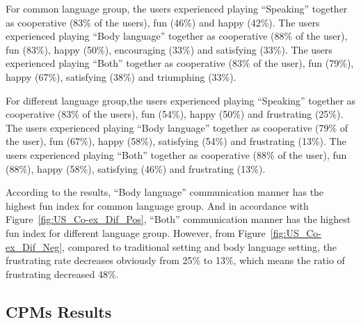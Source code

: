 For common language group, the users experienced playing ``Speaking'' together as cooperative (83\% of the users), fun (46\%) and happy (42\%). The users experienced playing ``Body language'' together as cooperative (88\% of the user), fun (83\%), happy (50\%), encouraging (33\%) and satisfying (33\%). The users experienced playing ``Both'' together as cooperative (83\% of the user), fun (79\%), happy (67\%), satisfying (38\%) and triumphing (33\%).

For different language group,the users experienced playing ``Speaking'' together as cooperative (83\% of the users), fun (54\%), happy (50\%) and frustrating (25\%). The users experienced playing ``Body language'' together as cooperative (79\% of the user), fun (67\%), happy (58\%), satisfying (54\%) and frustrating (13\%). The users experienced playing ``Both'' together as cooperative (88\% of the user), fun (88\%), happy (58\%), satisfying (46\%) and frustrating (13\%). 



According to the results, ``Body language'' communication manner has the highest fun index for common language group. And in accordance with Figure~\ref{fig:US_Co-ex_Dif_Pos}, ``Both'' communication manner has the highest fun index for different language group. However, from Figure~\ref{fig:US_Co-ex_Dif_Neg}, compared to traditional setting and body language setting, the frustrating rate decreases obviously from 25\% to 13\%, which means the ratio of frustrating decreased 48\%.


\subsection{CPMs Results}

